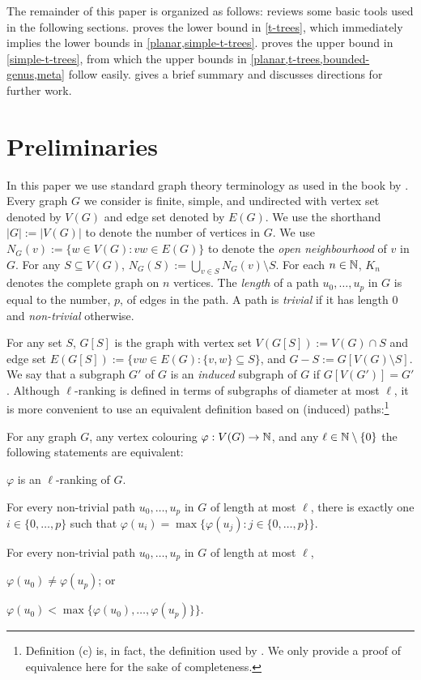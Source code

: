 \documentclass[kpfonts]{patmorin}
\newcommand{\defin}[1]{\emph{\color{brightmaroon}#1}}
\theoremstyle{named}
\begin{document}
The remainder of this paper is organized as follows:  reviews some basic tools used in the following sections.    proves the lower bound in \cref{t-trees}, which immediately implies the lower bounds in \cref{planar,simple-t-trees}.  proves the upper bound in \cref{simple-t-trees}, from which the upper bounds in \cref{planar,t-trees,bounded-genus,meta} follow easily.   gives a brief summary and discusses directions for further work.

\section{Preliminaries}
\label{basics}

In this paper we use standard graph theory terminology as used in the book by \citet{diestel:graph}.  Every graph $G$ we consider is finite, simple, and undirected with vertex set denoted by $V(G)$ and edge set denoted by $E(G)$.  We use the shorthand $|G|:=|V(G)|$ to denote the number of vertices in $G$.  We use $N_G(v):=\{w\in V(G): vw\in E(G)\}$ to denote the \defin{open neighbourhood} of $v$ in $G$. For any $S\subseteq V(G)$, $N_G(S):=\bigcup_{v\in S} N_G(v)\setminus S$.  For each $n\in\mathbb{N}$, $K_n$ denotes the complete graph on $n$ vertices.  The \defin{length} of a path $u_0,\ldots,u_p$ in $G$ is equal to the number, $p$, of edges in the path. A path is \defin{trivial} if it has length 0 and \defin{non-trivial} otherwise.

For any set $S$, $G[S]$ is the graph with vertex set $V(G[S]):=V(G)\cap S$ and edge set $E(G[S]):=\{vw\in E(G): \{v,w\}\subseteq S\}$, and $G-S:=G[V(G)\setminus S]$.  We say that a subgraph $G'$ of $G$ is an \defin{induced} subgraph of $G$ if $G[V(G')]=G'$.  Although $\ell$-ranking is defined in terms of subgraphs of diameter at most $\ell$, it is more convenient to use an equivalent definition based on (induced) paths:\footnote{Definition (c) is, in fact, the definition used by \citet{karpas.neiman.ea:on}. We only provide a proof of equivalence here for the sake of completeness.}

\begin{obs}\label{equivalence}
  For any graph $G$, any vertex colouring $\varphi:V(G)\to\mathbb{N}$, and any $\ell\in\mathbb{N}\setminus\{0\}$ the following statements are equivalent:
  \begin{compactenum}[(a)]
    \item $\varphi$ is an $\ell$-ranking of $G$.
    \item For every non-trivial path $u_0,\ldots,u_p$ in $G$ of length at most $\ell$, there is exactly one $i\in\{0,\ldots,p\}$ such that $\varphi(u_i)=\max\{\varphi(u_j):j\in\{0,\ldots,p\}\}$.
    \item For every non-trivial path $u_0,\ldots,u_p$ in $G$ of length at most $\ell$,
    \begin{inparaenum}[(i)]
      \item $\varphi(u_0)\neq\varphi(u_p)$; or \item $\varphi(u_0)<\max\{\varphi(u_0),\ldots,\varphi(u_p)\}\}$.
    \end{inparaenum}
  \end{compactenum}
\end{obs}
\end{document}
